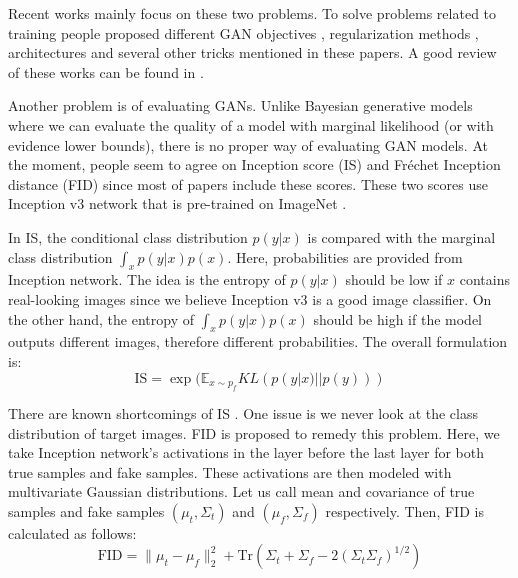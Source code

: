 \documentclass[a4paper,onesided,12pt]{report}
\begin{document}
Recent works mainly focus on these two problems. To solve problems related to training people proposed different GAN objectives \cite{arjovsky2017wasserstein,infogan,leastgan,qi2018loss}, regularization methods \cite{improved_wgan,sngan,dcgan}, architectures \cite{brock2018large,bigan,ali,karras2017progressive,karras2018style,dcgan,sagan} and several other tricks mentioned in these papers. A good review of these works can be found in \cite{ganreview,ganreview2,ganreview3}.

Another problem is of evaluating GANs. Unlike Bayesian generative models where we can evaluate the quality of a model with marginal likelihood (or with evidence lower bounds), there is no proper way of evaluating GAN models. At the moment, people seem to agree on Inception score (IS) \cite{improvedtechniques} and Fr\'echet Inception distance (FID) \cite{twotimes} since most of papers include these scores. These two scores use Inception v3 network \cite{inceptionv3} that is pre-trained on ImageNet \cite{imagenet}. 

In IS, the conditional class distribution $p(y|x)$ is compared with the marginal class distribution $\int_x p(y|x) p(x)$. Here, probabilities are provided from Inception network. The idea is the entropy of $p(y|x)$ should be low if $x$ contains real-looking images since we believe Inception v3 is a good image classifier. On the other hand, the entropy of $\int_x p(y | x) p(x)$ should be high if the model outputs different images, therefore different probabilities. The overall formulation is:
\begin{equation}
\label{eq:is}
\text{IS}=\exp (\mathbb{E}_{x \sim p_f} KL (p(y|x) || p(y))) 
\end{equation}

There are known shortcomings of IS \cite{twotimes,inceptionnote}. One issue is we never look at the class distribution of target images. FID is proposed to remedy this problem. Here, we take Inception network's activations in the layer before the last layer for both true samples and fake samples. These activations are then modeled with multivariate Gaussian distributions. Let us call mean and covariance of true samples and fake samples $(\mu_t, \Sigma_t)$ and $(\mu_f, \Sigma_f)$ respectively. Then, FID is calculated as follows:
\begin{equation}
\label{eq:fid}
\text{FID} = \| \mu_t - \mu_f \|_2^2 + \text{Tr}(\Sigma_t + \Sigma_f - 2(\Sigma_t \Sigma_f)^{1/2})
\end{equation}
\end{document}
